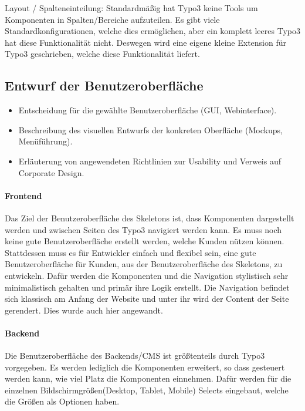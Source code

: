 Layout / Spalteneinteilung: Standardmäßig hat Typo3 keine Tools um Komponenten in Spalten/Bereiche aufzuteilen. Es gibt viele Standardkonfigurationen, welche dies ermöglichen, aber ein komplett leeres Typo3 hat diese Funktionalität nicht. Deswegen wird eine eigene kleine Extension für Typo3 geschrieben, welche diese Funktionalität liefert.


\subsection{Entwurf der Benutzeroberfläche}
\label{sec:Benutzeroberflaeche} 
\begin{itemize}
	\item Entscheidung für die gewählte Benutzeroberfläche (\zB GUI, Webinterface).
	\item Beschreibung des visuellen Entwurfs der konkreten Oberfläche (\zB Mockups, Menüführung).
	\item \Ggfs Erläuterung von angewendeten Richtlinien zur Usability und Verweis auf Corporate Design.
\end{itemize}

\paragraph{Frontend} 
\linebreak
Das Ziel der Benutzeroberfläche des Skeletons ist, dass Komponenten dargestellt werden und zwischen Seiten des Typo3 navigiert werden kann. Es muss noch keine gute Benutzeroberfläche erstellt werden, welche Kunden nützen können. Stattdessen muss es für Entwickler einfach und flexibel sein, eine gute Benutzeroberfläche für Kunden, aus der Benutzeroberfläche des Skeletons, zu entwickeln. Dafür werden die Komponenten und die Navigation stylistisch sehr minimalistisch gehalten und primär ihre Logik erstellt. Die Navigation befindet sich klassisch am Anfang der Website und unter ihr wird der Content der Seite gerendert. Dies wurde auch hier angewandt.


\paragraph{Backend} 
\linebreak 
Die Benutzeroberfläche des Backends/CMS ist größtenteils durch Typo3 vorgegeben. Es werden lediglich die Komponenten erweitert, so dass gesteuert werden kann, wie viel Platz die Komponenten einnehmen. Dafür werden für die einzelnen Bildschirmgrößen(Desktop, Tablet, Mobile) Selects eingebaut, welche die Größen als Optionen haben.

